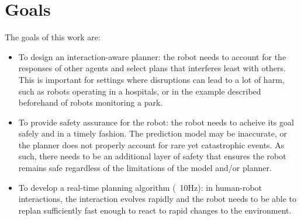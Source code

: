 \section{Goals}
\label{text:introduction/goals}
The goals of this work are:
\begin{itemize}
\item To design an interaction-aware planner: the robot needs to account for the responses of other agents and select plans that interferes least with others. This is important for settings where disruptions can lead to a lot of harm, such as robots operating in a hospitals, or in the example described beforehand of robots monitoring a park.
\item To provide safety assurance for the robot: the robot needs to acheive its goal safely and in a timely fashion. The prediction model may be inaccurate, or the planner does not properly account for rare yet catastrophic events. As such, there needs to be an additional layer of safety that ensures the robot remains safe regardless of the limitations of the model and/or planner.
\item To develop a real-time planning algorithm (~10Hz): in human-robot interactions, the interaction evolves rapidly and the robot needs to be able to replan sufficiently fast enough to react to rapid changes to the environment.
\end{itemize}